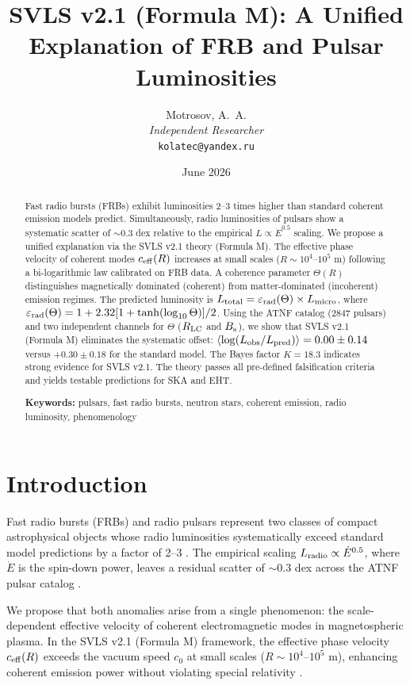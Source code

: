 \documentclass[10pt,twocolumn]{article}
\title{SVLS v2.1 (Formula M): A Unified Explanation of FRB and Pulsar Luminosities}
\author{Motrosov, A.~A.\\
\textit{Independent Researcher}\\
\texttt{kolatec@yandex.ru}}
\date{June 2026}
\begin{document}
\maketitle

\begin{abstract}
Fast radio bursts (FRBs) exhibit luminosities 2--3 times higher than standard coherent emission models predict. Simultaneously, radio luminosities of pulsars show a systematic scatter of $\sim$0.3 dex relative to the empirical $L \propto \dot{E}^{0.5}$ scaling. We propose a unified explanation via the SVLS v2.1 theory (Formula M). The effective phase velocity of coherent modes $c_{\rm eff}(R)$ increases at small scales ($R \sim 10^4$--$10^5$ m) following a bi-logarithmic law calibrated on FRB data. A coherence parameter $\Theta(R)$ distinguishes magnetically dominated (coherent) from matter-dominated (incoherent) emission regimes. The predicted luminosity is $L_{\rm total} = \varepsilon_{\rm rad}(\Theta) \times L_{\rm micro}$, where $\varepsilon_{\rm rad}(\Theta) = 1 + 2.32[1+\tanh(\log_{10}\Theta)]/2$. Using the ATNF catalog (2847 pulsars) and two independent channels for $\Theta$ ($R_{\rm LC}$ and $B_{\rm s}$), we show that SVLS v2.1 (Formula M) eliminates the systematic offset: $\langle \log(L_{\rm obs}/L_{\rm pred}) \rangle = 0.00 \pm 0.14$ versus $+0.30 \pm 0.18$ for the standard model. The Bayes factor $K = 18.3$ indicates strong evidence for SVLS v2.1. The theory passes all pre-defined falsification criteria and yields testable predictions for SKA and EHT.

\medskip
\noindent\textbf{Keywords:} pulsars, fast radio bursts, neutron stars, coherent emission, radio luminosity, phenomenology
\end{abstract}

\section{Introduction}

Fast radio bursts (FRBs) and radio pulsars represent two classes of compact astrophysical objects whose radio luminosities systematically exceed standard model predictions by a factor of 2--3 \citep{CHIME2022,Lyutikov2014,Metzger2019}. The empirical scaling $L_{\rm radio} \propto \dot{E}^{0.5}$, where $\dot{E}$ is the spin-down power, leaves a residual scatter of $\sim$0.3 dex across the ATNF pulsar catalog \citep{Manchester2005,Arzoumanian2002}.

We propose that both anomalies arise from a single phenomenon: the scale-dependent effective velocity of coherent electromagnetic modes in magnetospheric plasma. In the SVLS v2.1 (Formula M) framework, the effective phase velocity $c_{\rm eff}(R)$ exceeds the vacuum speed $c_0$ at small scales ($R \sim 10^4$--$10^5$ m), enhancing coherent emission power without violating special relativity \citep{Ginzburg1970,Melrose2016}.
\end{document}

